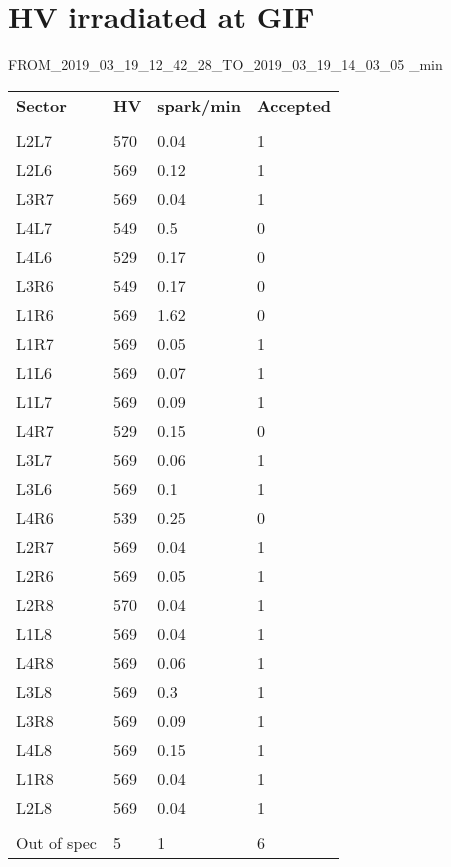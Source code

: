 \documentclass{article}%
\begin{document}
\section*{HV irradiated at GIF}%
\label{sec:HV irradiated at GIF}%
\newline%
%
FROM\_2019\_03\_19\_12\_42\_28\_TO\_2019\_03\_19\_14\_03\_05%
\_min%
\linebreak%
\renewcommand{\arraystretch}{1.5}%
\begin{longtabu}{X[l] X[r] X[r] X[r]}%
%
\textbf{Sector}&\textbf{HV}&\textbf{spark/min}&\textbf{Accepted}\\%
&&&\\%
\hline%
%
L2L7&570&0.04&1\\%
L2L6&569&0.12&1\\%
%
L3R7&569&0.04&1\\%
L4L7&549&0.5&0\\%
%
L4L6&529&0.17&0\\%
L3R6&549&0.17&0\\%
%
L1R6&569&1.62&0\\%
L1R7&569&0.05&1\\%
%
L1L6&569&0.07&1\\%
L1L7&569&0.09&1\\%
%
L4R7&529&0.15&0\\%
L3L7&569&0.06&1\\%
%
L3L6&569&0.1&1\\%
L4R6&539&0.25&0\\%
%
L2R7&569&0.04&1\\%
L2R6&569&0.05&1\\%
%
L2R8&570&0.04&1\\%
L1L8&569&0.04&1\\%
%
L4R8&569&0.06&1\\%
L3L8&569&0.3&1\\%
%
L3R8&569&0.09&1\\%
L4L8&569&0.15&1\\%
%
L1R8&569&0.04&1\\%
L2L8&569&0.04&1\\%
&&&\\%
\hline%
Out of spec&5&1&6\\%
\end{longtabu}
\end{document}
